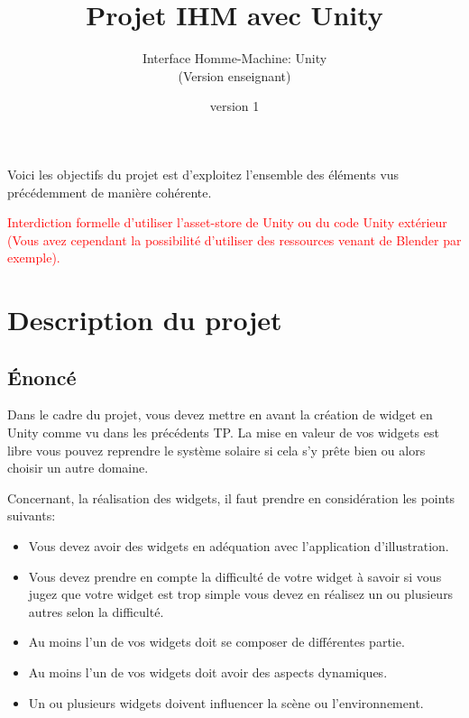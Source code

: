 \documentclass[a4paper,10pt]{article}
\begin{document}
	


\title{\vspace*{-1cm}Projet IHM avec Unity}
\author{\vspace*{-1.5cm}Interface Homme-Machine: Unity
\begin{ensnote}
	(Version enseignant)
\end{ensnote}
}
\date{\vspace*{-1.5cm}version 1}
\maketitle
\thispagestyle{fancy}

Voici les objectifs du projet est d'exploitez l'ensemble des éléments vus précédemment de manière cohérente.

\textcolor{red}{Interdiction formelle d'utiliser l'asset-store de Unity ou du code Unity extérieur (Vous avez cependant la possibilité d'utiliser des ressources venant de Blender par exemple).}


\section{Description du projet}

\subsection{Énoncé}
Dans le cadre du projet, vous devez mettre en avant la création de widget en Unity comme vu dans les précédents TP. La mise en valeur de vos widgets est libre vous pouvez reprendre le système solaire si cela s'y prête bien ou alors choisir un autre domaine.

Concernant, la réalisation des widgets, il faut prendre en considération les points suivants:
\begin{itemize}
	\item Vous devez avoir des widgets en adéquation avec l'application d'illustration.
	\item Vous devez prendre en compte la difficulté de votre widget à savoir si vous jugez que votre widget est trop simple vous devez en réalisez un ou plusieurs autres selon la difficulté.
	\item Au moins l'un de vos widgets doit se composer de différentes partie.
	\item Au moins l'un de vos widgets doit avoir des aspects dynamiques.
	\item Un ou plusieurs widgets doivent influencer la scène ou l'environnement.
\end{itemize}
\end{document}
